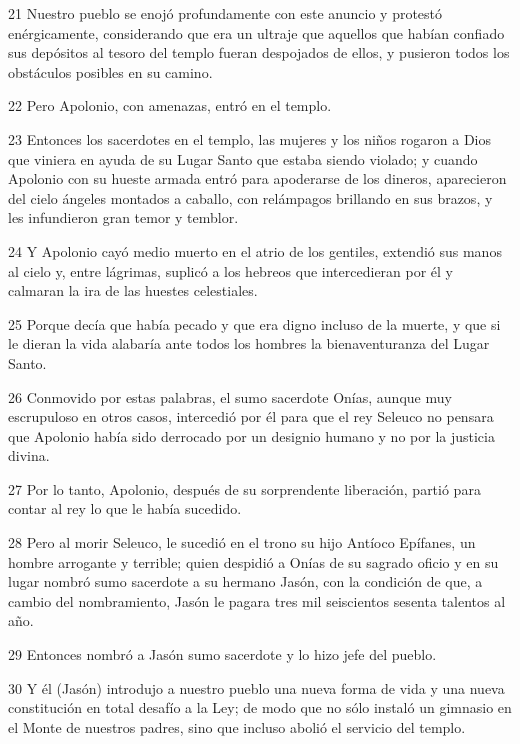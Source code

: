 \par 21 Nuestro pueblo se enojó profundamente con este anuncio y protestó enérgicamente, considerando que era un ultraje que aquellos que habían confiado sus depósitos al tesoro del templo fueran despojados de ellos, y pusieron todos los obstáculos posibles en su camino.

\par 22 Pero Apolonio, con amenazas, entró en el templo.

\par 23 Entonces los sacerdotes en el templo, las mujeres y los niños rogaron a Dios que viniera en ayuda de su Lugar Santo que estaba siendo violado; y cuando Apolonio con su hueste armada entró para apoderarse de los dineros, aparecieron del cielo ángeles montados a caballo, con relámpagos brillando en sus brazos, y les infundieron gran temor y temblor.

\par 24 Y Apolonio cayó medio muerto en el atrio de los gentiles, extendió sus manos al cielo y, entre lágrimas, suplicó a los hebreos que intercedieran por él y calmaran la ira de las huestes celestiales.

\par 25 Porque decía que había pecado y que era digno incluso de la muerte, y que si le dieran la vida alabaría ante todos los hombres la bienaventuranza del Lugar Santo.

\par 26 Conmovido por estas palabras, el sumo sacerdote Onías, aunque muy escrupuloso en otros casos, intercedió por él para que el rey Seleuco no pensara que Apolonio había sido derrocado por un designio humano y no por la justicia divina.

\par 27 Por lo tanto, Apolonio, después de su sorprendente liberación, partió para contar al rey lo que le había sucedido.

\par 28 Pero al morir Seleuco, le sucedió en el trono su hijo Antíoco Epífanes, un hombre arrogante y terrible; quien despidió a Onías de su sagrado oficio y en su lugar nombró sumo sacerdote a su hermano Jasón, con la condición de que, a cambio del nombramiento, Jasón le pagara tres mil seiscientos sesenta talentos al año.

\par 29 Entonces nombró a Jasón sumo sacerdote y lo hizo jefe del pueblo.

\par 30 Y él (Jasón) introdujo a nuestro pueblo una nueva forma de vida y una nueva constitución en total desafío a la Ley; de modo que no sólo instaló un gimnasio en el Monte de nuestros padres, sino que incluso abolió el servicio del templo.

